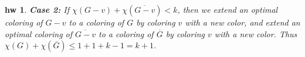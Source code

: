\documentclass[twocolumn]{article}
\newtheorem{problem}{problem}
\newtheorem{solution}{solution}
\newtheorem{hw}{hw}
\begin{document}
\begin{CJK*}{UTF8}{bkai}
\begin{hw}
\textbf{Case 2:} If $\chi(G - v) + \chi(\overline{G - v}) < k$, then we extend an optimal coloring of $G - v$ to a coloring of $G$ by coloring $v$ with a new color, and extend an optimal coloring of $\overline{G - v}$ to a coloring of $\overline{G}$ by coloring $v$ with a new color. Thus $\chi(G) + \chi(\overline{G}) \leq 1 + 1 + k - 1 = k + 1$.

\end{hw}

    

    



\end{CJK*}
\end{document}
